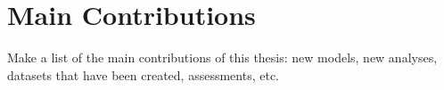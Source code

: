 
\section{Main Contributions}
\label{section:introduction:contributions}

Make a list of the main contributions of this thesis: new models, new analyses, datasets that have been created, assessments, etc.